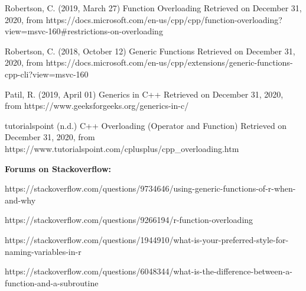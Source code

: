 \documentclass[12pt]{article}
\begin{document}
\begin{thebibliography}{50}
Robertson, C. (2019, March 27) Function Overloading Retrieved on December 31, 2020, from https://docs.microsoft.com/en-us/cpp/cpp/function-overloading?view=msvc-160\#restrictions-on-overloading

Robertson, C. (2018, October 12) Generic Functions Retrieved on December 31, 2020, from https://docs.microsoft.com/en-us/cpp/extensions/generic-functions-cpp-cli?view=msvc-160

Patil, R. (2019, April 01) Generics in C++ Retrieved on December 31, 2020, from https://www.geeksforgeeks.org/generics-in-c/

tutorialspoint (n.d.) C++ Overloading (Operator and Function) Retrieved on December 31, 2020, from https://www.tutorialspoint.com/cplusplus/cpp\_overloading.htm

\textbf{Forums on Stackoverflow:}

https://stackoverflow.com/questions/9734646/using-generic-functions-of-r-when-and-why

https://stackoverflow.com/questions/9266194/r-function-overloading

https://stackoverflow.com/questions/1944910/what-is-your-preferred-style-for-naming-variables-in-r

https://stackoverflow.com/questions/6048344/what-is-the-difference-between-a-function-and-a-subroutine

\end{thebibliography}
\end{document}
